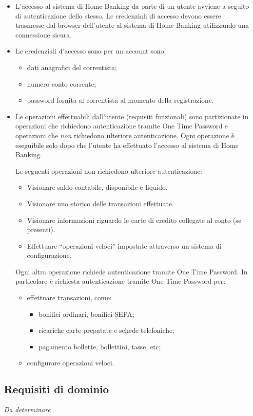 \begin{itemize}
	\item L'accesso al sistema di Home Banking da parte di un utente avviene a seguito di autenticazione dello stesso.
		Le credenziali di accesso devono essere trasmesse dal browser dell'utente al sistema di Home Banking utilizzando una connessione sicura.
	\item Le credenziali d'accesso sono per un account sono:
		\begin{itemize}
			\item dati anagrafici del correntista;
			\item numero conto corrente;
			\item password fornita al correntista al momento della registrazione.
		\end{itemize}
	\item Le operazioni effettuabili dall'utente (requisiti funzionali) sono partizionate in operazioni che richiedono autenticazione tramite One Time Password e operazioni che \emph{non} richiedono ulteriore autenticazione.
	Ogni operazione \`e eseguibile solo dopo che l'utente ha effettuato l'accesso al sistema di Home Banking.

	Le seguenti operazioni non richiedono ulteriore autenticazione:
	\begin{itemize}
		\item Visionare saldo contabile, disponibile e liquido.
		\item Visionare uno storico delle transazioni effettuate.
		\item Visionare informazioni riguardo le carte di credito collegate al conto (se presenti).
		\item Effettuare ``operazioni veloci'' impostate attraverso un sistema di configurazione.
	\end{itemize}
	
	Ogni altra operazione richiede autenticazione tramite One Time Password.
	In particolare \`e richiesta autenticazione tramite One Time Password per:
	\begin{itemize}
		\item effettuare transazioni, come:
		\begin{itemize}
			\item bonifici ordinari, bonifici SEPA;
			\item ricariche carte prepatate e schede telefoniche;
			\item pagamento bollette, bollettini, tasse, etc;
		\end{itemize}
		\item configurare operazioni veloci.
	\end{itemize}
\end{itemize}

\subsection{Requisiti di dominio}

\emph{Da determinare}
